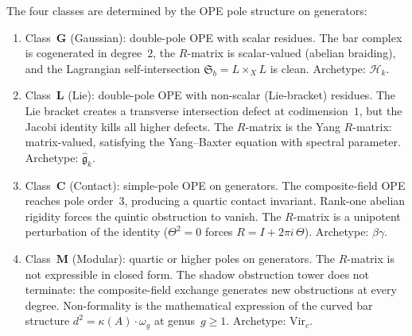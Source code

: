 \begin{remark}%
\label{rem:glcm-commentary}%
%
The four classes are determined by the OPE pole structure
on generators:
\begin{enumerate}[label=\textup{(\roman*)}]
\item Class~$\mathbf{G}$ \textup{(}Gaussian\textup{)}:
 double-pole OPE with scalar residues.
 The bar complex is cogenerated in degree~$2$,
 the $R$-matrix is scalar-valued (abelian braiding),
 and the Lagrangian self-intersection
 $\mathfrak{S}_b = L \times_X L$ is clean.
 Archetype: $\mathcal{H}_k$.

\item Class~$\mathbf{L}$ \textup{(}Lie\textup{)}:
 double-pole OPE with non-scalar
 \textup{(}Lie-bracket\textup{)} residues.
 The Lie bracket creates a transverse intersection defect
 at codimension~$1$, but the Jacobi identity kills all
 higher defects. The $R$-matrix is the Yang $R$-matrix:
 matrix-valued, satisfying the Yang--Baxter equation
 with spectral parameter.
 Archetype: $\widehat{\mathfrak{g}}_k$.

\item Class~$\mathbf{C}$ \textup{(}Contact\textup{)}:
 simple-pole OPE on generators.
 The composite-field OPE reaches pole order~$3$, producing a
 quartic contact invariant. Rank-one abelian rigidity
 forces the quintic obstruction to vanish.
 The $R$-matrix is a unipotent perturbation of the identity
 ($\Theta^2 = 0$ forces $R = I + 2\pi i\,\Theta$).
 Archetype: $\beta\gamma$.

\item Class~$\mathbf{M}$ \textup{(}Modular\textup{)}:
 quartic or higher poles on generators.
 The $R$-matrix is not expressible in closed form.
 The shadow obstruction tower does not terminate: the composite-field
 exchange generates new obstructions at every degree.
 Non-formality is the mathematical expression of the
 curved bar structure $d^2 = \kappa(A) \cdot \omega_g$
 at genus~$g \ge 1$.
 Archetype: $\mathrm{Vir}_c$.
\end{enumerate}
\end{remark}

